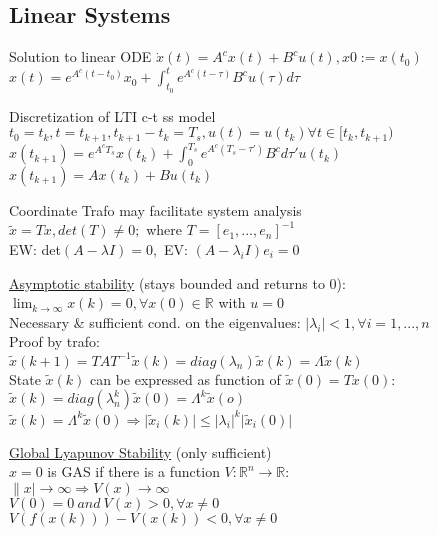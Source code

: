 \documentclass[10pt,parskip]{scrartcl}
\begin{document}
\begin{multicols*}{3}





\subsection{Linear Systems}

Solution to linear ODE $\dot x(t) = A^c x(t) + B^c u(t), x0:=x(t_0)$\\
$x(t) = e^{A^c(t-t_0)} x_0 + \int_{t_0}^t e^{A^c(t-\tau)} B^c u(\tau) d \tau$

Discretization of LTI c-t ss model\\
$t_0 = t_k, t = t_{k+1}, t_{k+1}-t_k = T_s, u(t) = u(t_k) \forall t \in [t_k, t_{k+1})$\\
$x(t_{k+1}) = e^{A^c T_s} x(t_k) + \int_{0}^{T_s} e^{A^c(T_s-\tau')} B^c d \tau' u(t_k)$\\
$x(t_{k+1}) = A x(t_k) + B u(t_k)$

Coordinate Trafo may facilitate system analysis\\
$\tilde x = Tx, det(T) \ne 0;$ where $T = [e_1, ..., e_n]^{-1}$\\
EW: det$(A - \lambda I)=0,$ EV: $(A-\lambda_i I) e_i = 0$


\underline{Asymptotic stability} (stays bounded and returns to 0): \\
$\lim_{k  \to \infty} x(k) = 0, \forall x(0) \in \mathbb{R}$ with $u = 0$\\
Necessary \& sufficient cond. on the eigenvalues:
$\vert \lambda_i \vert < 1, \forall i = 1,...,n$ \\
Proof by trafo:\\
$\tilde x(k+1) = T A T^{-1} \tilde x(k) = diag( \lambda_n) \tilde x(k)  = \Lambda \tilde x(k)   $\\
State $\tilde x(k)$ can be expressed as function of $\tilde x(0) = T x(0)$: \\
$\tilde x(k) = diag( \lambda_n^k) \tilde x(0)  = \Lambda^k \tilde x(o)$   \\
$\tilde x(k) =\Lambda^k \tilde x(0) \Rightarrow \vert \tilde x_i(k) \vert \leq \vert \lambda_i \vert^k  \vert \tilde x_i(0) \vert$


\underline{Global Lyapunov Stability} (only sufficient)\\
$x=0$ is GAS if there is a function $V: \mathbb{R}^n \rightarrow \mathbb{R}$:\\
$\|x| \rightarrow \infty \Rightarrow V(x) \rightarrow  \infty$  \\
$V(0) = 0 \ and \ V(x)>0, \forall x \ne 0 $ \\
$V(f(x(k))) - V(x(k)) < 0, \forall x \ne 0 $ 


\end{multicols*}
\end{document}
